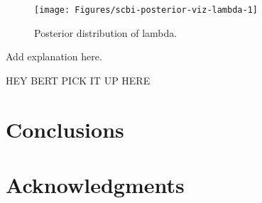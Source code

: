 \documentclass[12pt]{article}
\begin{document}
\begin{figure}

{\centering \texttt{[image: Figures/scbi-posterior-viz-lambda-1]} 

}

\caption{Posterior distribution of lambda.}\label{fig:scbi-posterior-viz-lambda}
\end{figure}

Add explanation here.

HEY BERT PICK IT UP HERE

\hypertarget{conclusions}{%
\section{Conclusions}\label{conclusions}}

\hypertarget{acknowledgments}{%
\section{Acknowledgments}\label{acknowledgments}}



\end{document}
